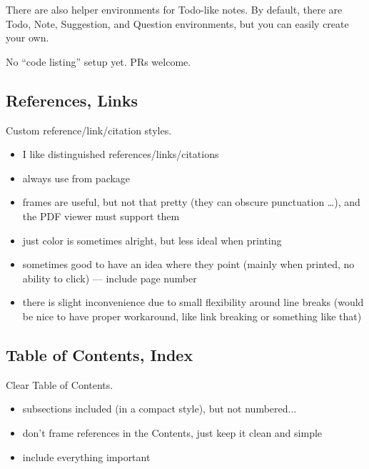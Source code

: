 \begin{remark}
    There are also helper environments for \textsf{Todo}-like notes.
    By default, there are \textsf{Todo}, \textsf{Note}, \textsf{Suggestion}, and \textsf{Question} environments, but you can easily create your own.
\end{remark}

\begin{Note}
    No \enquote{code listing} setup yet.
    PRs welcome.
\end{Note}

\subsection{References, Links}%
\label{sub:References Links}

Custom reference/link/citation styles.
\begin{itemize}
    \item I like distinguished references/links/citations
    \item always use \macro{\Cref} from  package
    \item frames are useful, but not that pretty (they can obscure punctuation \ldots),
          and the PDF viewer must support them
    \item just color is sometimes alright, but less ideal when printing
    \item sometimes good to have an idea where they point (mainly when printed, no ability to click) --- include page number
    \item there is slight inconvenience due to small flexibility around line breaks (would be nice to have proper workaround, like link breaking or something like that)
\end{itemize}

\subsection{Table of Contents, Index}%
\label{sub:Table of Contents and Index}

Clear Table of Contents.
\begin{itemize}
    \item subsections included (in a compact style), but not numbered...
    \item don't frame references in the Contents, just keep it clean and simple
    \item include everything important
\end{itemize}

